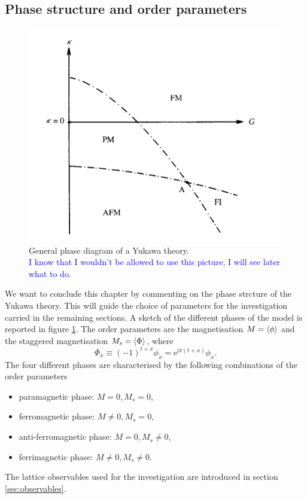 \subsection{Phase structure and order parameters}
\begin{figure}
    \centering
    \includegraphics[scale=0.5]{figures/yukawa_phase_diagram.png}
    \caption[Yukawa phase diagram]{General phase diagram of a Yukawa theory. \\ \textcolor{blue}{I know that I wouldn't be allowed to use this picture, I will see later what to do.}}
    \label{fig:yukawa_phase_diagram}
\end{figure}
We want to conclude this chapter by commenting on the phase strcture of the Yukawa theory. This will guide the choice of parameters for the investigation carried in the remaining sections. A sketch of the different phases of the model is reported in figure \ref{fig:yukawa_phase_diagram}. 
The order parameters are the magnetisation $M = \left\langle \phi \right\rangle$ and the staggered magnetisation $M_s = \left\langle \Phi \right\rangle$, where
\begin{equation}
    {\Phi}_x \equiv(-1)^{t+x} \phi_x=\mathrm{e}^{\mathrm{i} \pi\left(t+x\right)} \phi_x .
\end{equation}
The four different phases are characterised by the following combinations of the order parameters
\begin{itemize}
    \item paramagnetic phase: $M = 0, M_s = 0$,
    \item ferromagnetic phase: $M \neq 0, M_s = 0$,
    \item anti-ferromagnetic phase: $M = 0, M_s \neq 0$,
    \item ferrimagnetic phase: $M \neq 0, M_s \neq 0$.
\end{itemize}
The lattice observables used for the investigation are introduced in section \ref{sec:observables}.